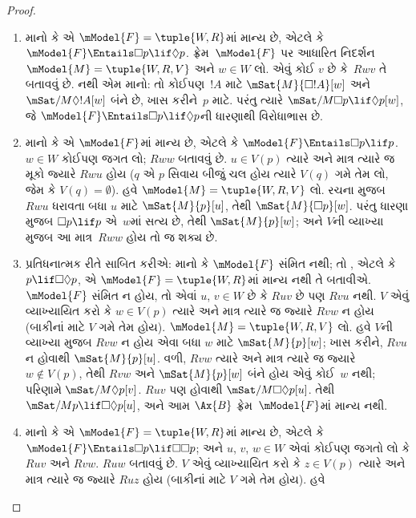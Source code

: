 \begin{proof}
  \begin{enumerate}
  \item માનો કે  એ $\mModel{F} = \tuple{W, R}$માં
    માન્ય છે, એટલે કે
    $\mModel{F} \Entails \Box p \lif \Diamond p$.
    ફ્રેમ~$\mModel{F}$ પર આધારિત નિદર્શન $\mModel{M} =
    \tuple{W, R, V}$ અને $w \in
    W$ લો. એવું કોઈ $v$ છે કે~$Rwv$ તે બતાવવું છે.
    નથી એમ માનો: તો કોઈપણ~$!A$ માટે
    $\mSat{M}{\Box !A}[w]$ અને
    $\mSat/{M}{\Diamond !A}[w]$ બંને છે, ખાસ કરીને~$p$
    માટે. પરંતુ ત્યારે $\mSat/{M}{\Box p \lif
      \Diamond p}[w]$, જે $\mModel{F}
    \Entails \Box p \lif \Diamond p$ની ધારણાથી વિરોધાભાસ છે.
  \item માનો કે  એ $\mModel{F}$માં માન્ય છે,
    એટલે કે $\mModel{F} \Entails \Box
    p \lif p$. $w \in W$ કોઈપણ જગત લો;
    $Rww$ બતાવવું છે. $u \in V(p)$ ત્યારે અને માત્ર
    ત્યારે જ મૂકો જ્યારે $Rwu$ હોય ($q$ એ $p$ સિવાય
    બીજું ચલ હોય ત્યારે $V(q)$ ગમે તેમ લો, જેમ કે
    $V(q) = \emptyset$). હવે
    $\mModel{M} = \tuple{W, R, V}$ લો. રચના મુજબ
    $Rwu$ ધરાવતા બધા $u$ માટે $\mSat{M}{p}[u]$,
    તેથી $\mSat{M}{\Box p}[w]$. પરંતુ ધારણા મુજબ
    $\Box p \lif p$ એ~$w$માં સત્ય છે, તેથી
    $\mSat{M}{p}[w]$; અને $V$ની વ્યાખ્યા મુજબ આ
    માત્ર~$Rww$ હોય તો જ શક્ય છે.
  \item પ્રતિધનાત્મક રીતે સાબિત કરીએ: માનો કે
    $\mModel{F}$ સંમિત નથી; તો , એટલે કે
    $p \lif \Box\Diamond p$, એ $\mModel{F}= \tuple{W, R}$માં
    માન્ય નથી તે બતાવીએ. $\mModel{F}$ સંમિત ન હોય,
    તો એવાં $u$, $v \in W$ છે કે $Ruv$ છે પણ
    $Rvu$ નથી. $V$ એવું વ્યાખ્યાયિત કરો કે
    $w \in V(p)$ ત્યારે અને માત્ર ત્યારે જ જ્યારે
    $Rvw$ ન હોય (બાકીનાં માટે $V$ ગમે તેમ હોય).
    $\mModel{M} =\tuple{W, R,
      V}$ લો. હવે $V$ની વ્યાખ્યા મુજબ $Rvw$ ન હોય
    એવા બધા $w$ માટે $\mSat{M}{p}[w]$; ખાસ કરીને,
    $Rvu$ ન હોવાથી $\mSat{M}{p}[u]$. વળી,
    $Rvw$ ત્યારે અને માત્ર ત્યારે જ જ્યારે
    $w \notin V(p)$, તેથી $Rvw$ અને
    $\mSat{M}{p}[w]$ બંને હોય એવું કોઈ~$w$ નથી;
    પરિણામે $\mSat/{M}{\Diamond p}[v]$. $Ruv$
    પણ હોવાથી $\mSat/{M}{\Box\Diamond p}[u]$.
    તેથી $\mSat/{M}{p \lif
      \Box\Diamond p}[u]$, અને આમ $\Ax{B}$
    ફ્રેમ~$\mModel{F}$માં માન્ય નથી.
  \item માનો કે  એ $\mModel{F} = \tuple{W,R}$માં
    માન્ય છે, એટલે કે
    $\mModel{F} \Entails \Box p \lif \Box\Box p$;
    અને $u$, $v$, $w \in W$ એવાં કોઈપણ જગતો લો
    કે $Ruv$ અને $Rvw$. $Ruw$ બતાવવું છે.
    $V$ એવું વ્યાખ્યાયિત કરો કે $z \in V(p)$ ત્યારે
    અને માત્ર ત્યારે જ જ્યારે $Ruz$ હોય (બાકીનાં
    માટે $V$ ગમે તેમ હોય). હવે

\end{enumerate}
\end{proof}
